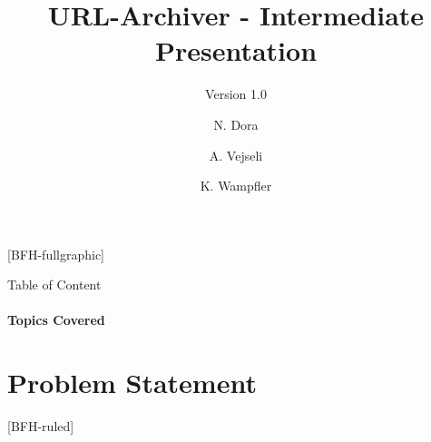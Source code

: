 \documentclass[
    ngerman,%
    authorontitle=true,
]{bfhbeamer}
\title{URL-Archiver - Intermediate Presentation}
\subtitle{Version 1.0}
\author[N. Dora \and A. Vejseli \and K. Wampfler]{N. Dora \and A. Vejseli \and K. Wampfler}
\institute{School of Engineering and Computer Science}
\begin{document}

    [BFH-fullgraphic]
    \maketitle



    \begin{frame}{Table of Content}
        \framesubtitle{Topics Covered}
        \setcounter{tocdepth}{2}
        \tableofcontents
    \end{frame}



    \section{Problem Statement}
    [BFH-ruled]
    \frame{\sectionpage}
\end{document}
